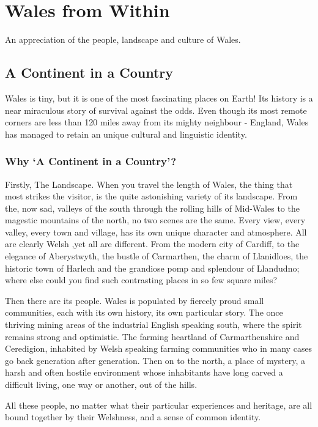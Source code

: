 \documentclass{article}
\begin{document}
\pagebreak
\section{Wales from Within}

An appreciation of the people, landscape and culture of Wales.

\subsection{A Continent in a Country}

Wales is tiny, but it is one of the most fascinating places on Earth!
Its history is a near miraculous story of survival against the odds.
Even though its most remote corners are less than 120 miles away from its mighty neighbour - England, Wales has managed to retain an unique cultural and linguistic identity.

\subsubsection{Why `A Continent in a Country'?}

Firstly, The Landscape.
When you travel the length of Wales, the thing that most strikes the visitor, is the quite astonishing variety of its landscape.
From the, now sad, valleys of the south through the rolling hills of Mid-Wales to the magestic mountains of the north, no two scenes are the same.
Every view, every valley, every town and village, has its own unique character and atmosphere.
All are clearly Welsh ,yet all are different.
From the modern city of Cardiff, to the elegance of Aberystwyth, the bustle of Carmarthen, the charm of Llanidloes, the historic town of Harlech and the grandiose pomp and splendour of Llandudno; where else could you find such contrasting places in so few square miles?

Then there are its people.
Wales is populated by fiercely proud small communities, each with its own history, its own particular story.
The once thriving mining areas of the industrial English speaking south, where the spirit remains strong and optimistic.
The farming heartland of Carmarthenshire and Ceredigion, inhabited by Welsh speaking farming communities who in many cases go back generation after generation.
Then on to the north, a place of mystery, a harsh and often hostile environment whose inhabitants have long carved a difficult living, one way or another, out of the hills.

All these people, no matter what their particular experiences and heritage, are all bound together by their Welshness, and a sense of common identity.
\end{document}
